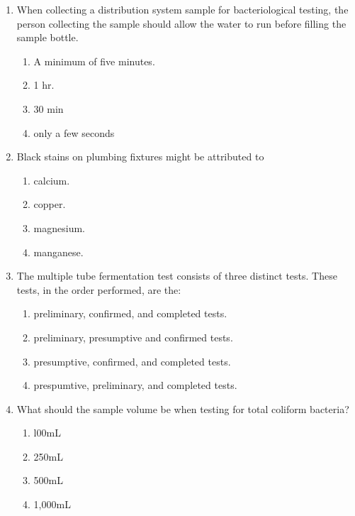 \begin{enumerate}[1.]
\item When collecting a distribution system sample for bacteriological testing, the person collecting the sample should allow the water to run before filling the sample bottle.
\begin{enumerate}
\item A minimum of five minutes.
\item 1 hr.
\item 30 min
\item only a few seconds
\end{enumerate}

\item Black stains on plumbing fixtures might be attributed to
\begin{enumerate}
\item calcium.
\item copper.
\item magnesium.
\item manganese.
\end{enumerate}

\item The multiple tube fermentation test consists of three distinct tests. These tests, in the order performed, are the:
\begin{enumerate}
\item preliminary, confirmed, and completed tests.
\item preliminary, presumptive and confirmed tests.
\item presumptive, confirmed, and completed tests.
\item prespumtive, preliminary, and completed tests.
\end{enumerate}

\item What should the sample volume be when testing for total coliform bacteria?
\begin{enumerate}
\item l00mL
\item 250mL
\item 500mL
\item 1,000mL
\end{enumerate}


\end{enumerate}
